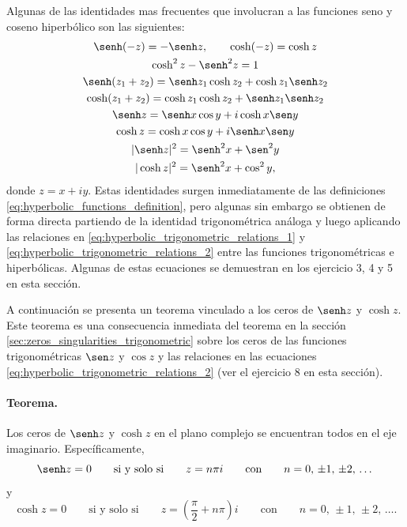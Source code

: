 \documentclass[a4paper]{report}
\begin{document}
Algunas de las identidades mas frecuentes que involucran a las funciones seno y coseno hiperbólico son las siguientes:
\begin{gather}
 \senh(-z)=-\senh z,\qquad\cosh(-z)=\cosh z\label{eq:hyperbolic_relations_parity}\\
 \cosh^2z-\senh^2z=1\label{eq:hyperbolic_relations_square_substraction}\\
 \senh(z_1+z_2)=\senh z_1\cosh z_2+\cosh z_1\senh z_2\label{eq:hyperbolic_relations_senh_sum_arguments}\\ 
 \cosh(z_1+z_2)=\cosh z_1\cosh z_2+\senh z_1\senh z_2\label{eq:hyperbolic_relations_cosh_sum_arguments}\\
 \senh z=\senh x\cos y+i\cosh x\sen y\label{eq:hyperbolic_relations_senh_components}\\
 \cosh z=\cosh x\cos y+i\senh x\sen y\label{eq:hyperbolic_relations_cosh_components}\\
 |\senh z|^2=\senh^2x+\sen^2y\label{eq:hyperbolic_relations_senh_square_modulus}\\
 |\cosh z|^2=\senh^2x+\cos^2y,\label{eq:hyperbolic_relations_cosh_square_modulus}
\end{gather}
donde \(z=x+iy\). Estas identidades surgen inmediatamente de las definiciones \ref{eq:hyperbolic_functions_definition}, pero algunas sin embargo se obtienen de forma  directa partiendo de la identidad trigonométrica análoga y luego aplicando las relaciones en \ref{eq:hyperbolic_trigonometric_relations_1} y \ref{eq:hyperbolic_trigonometric_relations_2} entre las funciones trigonométricas e hiperbólicas. Algunas de estas ecuaciones se demuestran en los ejercicio 3, 4 y 5 en esta sección.

A continuación se presenta un teorema vinculado a los ceros de \(\senh z\) y \(\cosh z\). Este teorema es una consecuencia inmediata del teorema en la sección \ref{sec:zeros_singularities_trigonometric} sobre los ceros de las funciones trigonométricas \(\sen z\) y \(\cos z\) y las relaciones en las ecuaciones \ref{eq:hyperbolic_trigonometric_relations_2} (ver el ejercicio 8 en esta sección).

\paragraph{Teorema.} Los ceros de \(\senh z\) y \(\cosh z\) en el plano complejo se encuentran todos en el eje imaginario. Específicamente,
\[
 \senh z=0
 \qquad\textrm{si y solo si}\qquad
 z=n\pi i
 \qquad\textrm{con}\qquad 
 n=0,\,\pm1,\,\pm2,\,\dots
\]
y
\[
 \cosh z=0
 \qquad\textrm{si y solo si}\qquad
 z=\left(\frac{\pi}{2}+n\pi\right)i
 \qquad\textrm{con}\qquad 
 n=0,\,\pm1,\,\pm2,\,\dots.
\]
\end{document}
